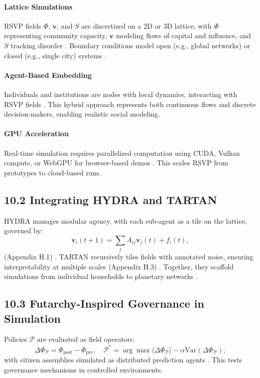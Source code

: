 \documentclass[12pt]{article}
\begin{document}
{{\paragraph{Lattice Simulations}
RSVP fields \(\Phi\), \(\mathbf{v}\), and \(S\) are discretized on a 2D or 3D lattice, with \(\Phi\) representing community capacity, \(\mathbf{v}\) modeling flows of capital and influence, and \(S\) tracking disorder \citep{gromov1999}. Boundary conditions model open (e.g., global networks) or closed (e.g., single city) systems \citep{baez2011}.

\paragraph{Agent-Based Embedding}
Individuals and institutions are nodes with local dynamics, interacting with RSVP fields \citep{pearl2009}. This hybrid approach represents both continuous flows and discrete decision-makers, enabling realistic social modeling.

\paragraph{GPU Acceleration}
Real-time simulation requires parallelized computation using CUDA, Vulkan compute, or WebGPU for browser-based demos \citep{bird1988}. This scales RSVP from prototypes to cloud-based runs.

\subsection*{10.2 Integrating HYDRA and TARTAN}

HYDRA manages modular agency, with each sub-agent as a tile on the lattice, governed by:
\[
\mathbf{v}_i(t+1) = \sum_j A_{ij} \mathbf{v}_j(t) + f_i(t),
\]
(Appendix H.1) \citep{bird1988}. TARTAN recursively tiles fields with annotated noise, ensuring interpretability at multiple scales (Appendix H.3) \citep{milewski2018}. Together, they scaffold simulations from individual households to planetary networks \citep{friston2010}.

\subsection*{10.3 Futarchy-Inspired Governance in Simulation}

Policies \(\mathcal{P}\) are evaluated as field operators:
\[
\Delta \Phi_{\mathcal{P}} = \Phi_{\text{post}} - \Phi_{\text{pre}}, \quad \mathcal{P}^* = \arg \max \langle \Delta \Phi_{\mathcal{P}} \rangle - \alpha \mathrm{Var}(\Delta \Phi_{\mathcal{P}}),
\]
with citizen assemblies simulated as distributed prediction agents \citep{hanson2003}. This tests governance mechanisms in controlled environments.

}}
\end{document}
